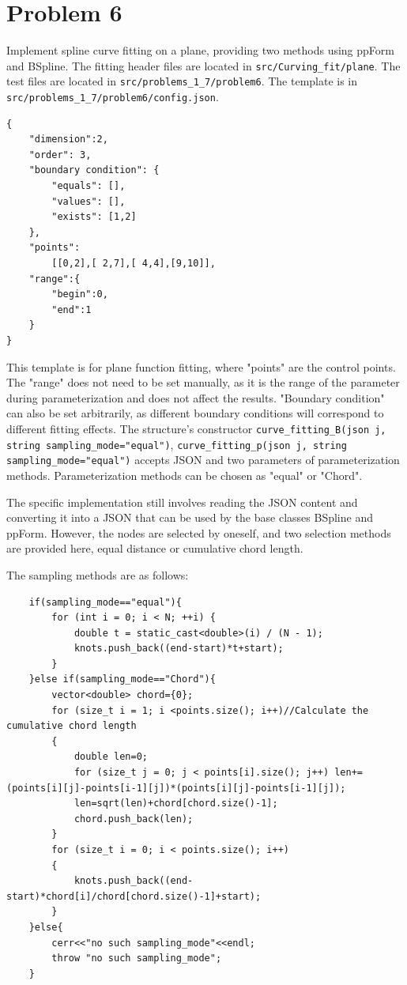 \documentclass[a4paper]{article}
\begin{document}
\section*{Problem 6}
Implement spline curve fitting on a plane, providing two methods using ppForm and BSpline.
The fitting header files are located in \texttt{src/Curving\_fit/plane}.
The test files are located in \texttt{src/problems\_1\_7/problem6}.
The template is in \texttt{src/problems\_1\_7/problem6/config.json}.

\begin{verbatim}
{
    "dimension":2,
    "order": 3,
    "boundary condition": {
        "equals": [],
        "values": [],
        "exists": [1,2]
    },
    "points": 
        [[0,2],[ 2,7],[ 4,4],[9,10]],
    "range":{
        "begin":0,
        "end":1
    }
}
\end{verbatim}

This template is for plane function fitting, where "points" are the control points. The "range" does not need to be set manually, as it is the range of the parameter during parameterization and does not affect the results.
"Boundary condition" can also be set arbitrarily, as different boundary conditions will correspond to different fitting effects.
The structure's constructor \texttt{curve\_fitting\_B(json j, string sampling\_mode="equal")}, \texttt{curve\_fitting\_p(json j, string sampling\_mode="equal")} accepts JSON and two parameters of parameterization methods.
Parameterization methods can be chosen as "equal" or "Chord".

The specific implementation still involves reading the JSON content and converting it into a JSON that can be used by the base classes BSpline and ppForm.
However, the nodes are selected by oneself, and two selection methods are provided here, equal distance or cumulative chord length.

The sampling methods are as follows:
\begin{verbatim}
    if(sampling_mode=="equal"){
        for (int i = 0; i < N; ++i) {
            double t = static_cast<double>(i) / (N - 1); 
            knots.push_back((end-start)*t+start);
        }
    }else if(sampling_mode=="Chord"){
        vector<double> chord={0};
        for (size_t i = 1; i <points.size(); i++)//Calculate the cumulative chord length
        {
            double len=0;
            for (size_t j = 0; j < points[i].size(); j++) len+=(points[i][j]-points[i-1][j])*(points[i][j]-points[i-1][j]);
            len=sqrt(len)+chord[chord.size()-1];
            chord.push_back(len);
        }
        for (size_t i = 0; i < points.size(); i++)
        {
            knots.push_back((end-start)*chord[i]/chord[chord.size()-1]+start);
        }
    }else{
        cerr<<"no such sampling_mode"<<endl;
        throw "no such sampling_mode";
    }
\end{verbatim}
\end{document}
